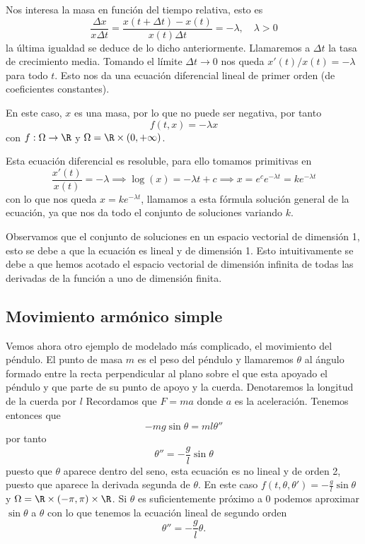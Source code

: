 \documentclass[../main.tex]{subfiles}
\begin{document}
Nos interesa la masa en función del tiempo relativa, esto es
\[\frac{\Delta x}{x \Delta t} = \frac{x(t + \Delta t) - x(t)}{x(t) \Delta t}
	= -\lambda, \quad \lambda > 0\]
la última igualdad se deduce de lo dicho anteriormente. Llamaremos a 
\(\Delta t\) la tasa de crecimiento media. Tomando el límite \(\Delta t \to 0\)
nos queda \(x'(t)/x(t) = -\lambda\) para todo \(t\). Esto nos da una ecuación
diferencial lineal de primer orden (de coeficientes constantes).

En este caso, \(x\) es una masa, por lo que no puede ser negativa, por tanto
\[f(t, x) = -\lambda x\]
con \(f : \Omega \to \R\) y \(\Omega = \R \times (0, +\infty)\).

Esta ecuación diferencial es resoluble, para ello tomamos primitivas en
\[\frac{x'(t)}{x(t)} = -\lambda \implies \log(x) = -\lambda t + c
	\implies x = e^c e^{-\lambda t} = k e^{-\lambda t}\]
con lo que nos queda \(x = k e^{-\lambda t}\), llamamos a esta fórmula solución
general de la ecuación, ya que nos da todo el conjunto de soluciones variando
\(k\).

Observamos que el conjunto de soluciones en un espacio vectorial de dimensión 1,
esto se debe a que la ecuación es lineal y de dimensión 1. Esto intuitivamente
se debe a que hemos acotado el espacio vectorial de dimensión infinita de todas
las derivadas de la función a uno de dimensión finita.

\subsection{Movimiento armónico simple}

Vemos ahora otro ejemplo de modelado más complicado, el movimiento del péndulo.
El punto de masa \(m\) es el peso del péndulo y llamaremos \(\theta\) al ángulo
formado entre la recta perpendicular al plano sobre el que esta apoyado el
péndulo y que parte de su punto de apoyo y la cuerda. Denotaremos la longitud
de la cuerda por \(l\) Recordamos que \(F = ma\) donde \(a\) es la aceleración. 
Tenemos entonces que
\[-m g \sin\theta = m l \theta''\]
por tanto
\[\theta'' = -\frac{g}{l} \sin\theta\]
puesto que \(\theta\) aparece dentro del seno, esta ecuación es no lineal y de
orden 2, puesto que aparece la derivada segunda de \(\theta\). En este caso 
\(f(t, \theta, \theta') = -\frac{g}{l} \sin\theta\) y \(\Omega = \R \times
(-\pi, \pi) \times \R\). Si \(\theta\) es suficientemente próximo a \(0\)
podemos aproximar \(\sin\theta\) a \(\theta\) con lo que tenemos la ecuación
lineal de segundo orden
\[\theta'' = -\frac{g}{l}\theta.\]
\end{document}

